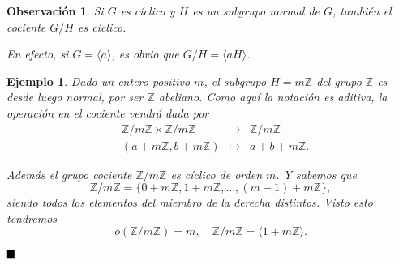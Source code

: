 \documentclass[12pt]{article}
\newtheorem{example}{Ejemplo}[theorem]
\newtheorem{observation}{Observación}[theorem]
\begin{document}
\begin{observation}Si $G$ es cíclico y $H$ es un subgrupo normal de $G$, también el cociente $G/H$ es cíclico. 

En efecto, si $G = \langle a \rangle$, es obvio que $G/H = \langle aH \rangle$.
\end{observation}

\begin{example}Dado un entero positivo $m$, el subgrupo $H = m\mathbb{Z}$ del grupo $\mathbb{Z}$ es desde luego normal, por ser $\mathbb{Z}$ abeliano. Como aquí la notación es aditiva, la operación en el cociente vendrá dada por 
$$\begin{array}{rccl}
&\mathbb{Z}/m\mathbb{Z} \times \mathbb{Z}/m\mathbb{Z} & \longrightarrow & \mathbb{Z}/m\mathbb{Z}\\
&(a+m\mathbb{Z}, b+m\mathbb{Z}) & \longmapsto &a+b+m\mathbb{Z}.
\end{array}
$$

Además el grupo cociente $\mathbb{Z}/m\mathbb{Z}$ es cíclico de orden $m$. Y sabemos que $$\mathbb{Z}/m\mathbb{Z} = \lbrace 0+m\mathbb{Z}, 1+m\mathbb{Z}, \ldots, (m-1)+m\mathbb{Z}\rbrace,$$ siendo todos los elementos del miembro de la derecha distintos. Visto esto tendremos $$o(\mathbb{Z}/m\mathbb{Z}) = m, \quad \mathbb{Z}/m\mathbb{Z} = \langle 1+m\mathbb{Z}\rangle.$$
\end{example}

$\hfill \blacksquare$
\end{document}
